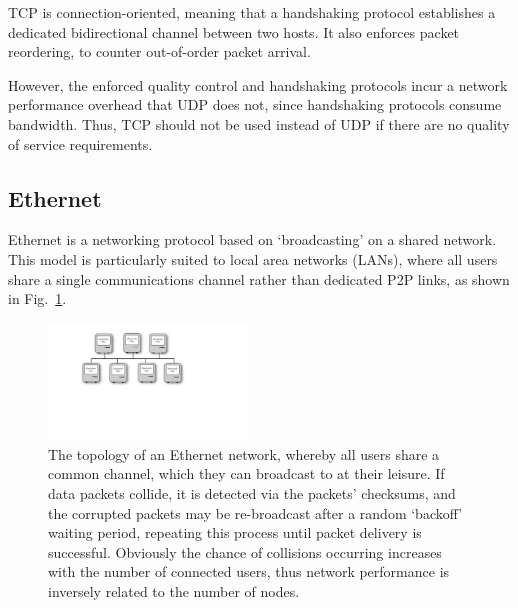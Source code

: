 TCP is connection-oriented, meaning that a handshaking protocol establishes a dedicated bidirectional channel between two hosts. It also enforces packet reordering, to counter out-of-order packet arrival.

However, the enforced quality control and handshaking protocols incur a network performance overhead that UDP does not, since handshaking protocols consume bandwidth. Thus, TCP should not be used instead of UDP if there are no quality of service requirements.

%
%

\subsection{Ethernet} 

Ethernet is a networking protocol based on `broadcasting' on a shared network. This model is particularly suited to local area networks (LANs), where all users share a single communications channel rather than dedicated P2P links, as shown in Fig.~\ref{fig:ethernet}.

\begin{figure}[!htbp]
	\includegraphics[width=0.475\textwidth]{ethernet}
	\captionspacefig \caption{The topology of an Ethernet network, whereby all users share a common channel, which they can broadcast to at their leisure. If data packets collide, it is detected via the packets' checksums, and the corrupted packets may be re-broadcast after a random `backoff' waiting period, repeating this process until packet delivery is successful. Obviously the chance of collisions occurring increases with the number of connected users, thus network performance is inversely related to the number of nodes.} \label{fig:ethernet}
\end{figure}

